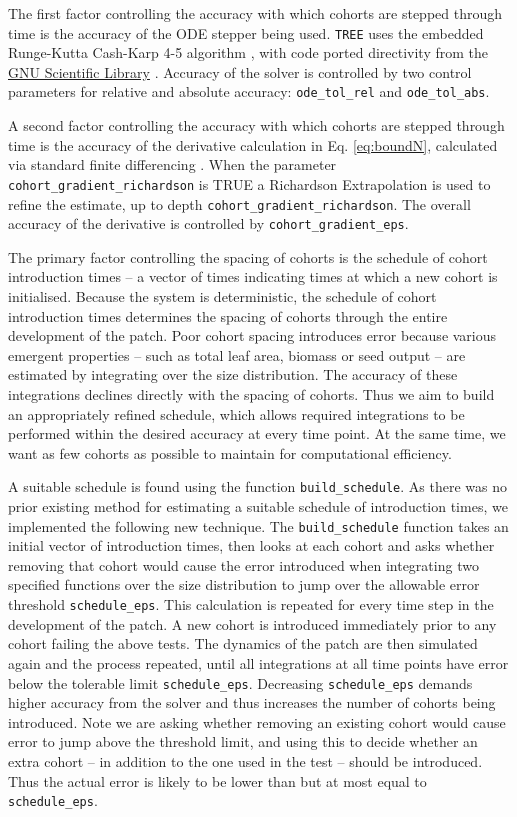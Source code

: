\documentclass[10pt,twoside]{article}
\begin{document}
The first factor controlling the accuracy with which cohorts are stepped
through time is the accuracy of the ODE stepper being used. \texttt{TREE} uses
the embedded Runge-Kutta Cash-Karp 4-5 algorithm \citep{Cash-1990}, with
code ported directivity from the
\href{http://www.gnu.org/software/gsl/}{GNU Scientific Library}
\citep{Galassi-2009}. Accuracy of the solver is controlled by two
control parameters for relative and absolute accuracy:
\texttt{ode\_tol\_rel} and \texttt{ode\_tol\_abs}.

A second factor controlling the accuracy with which cohorts are stepped
through time is the accuracy of the derivative calculation in Eq.
\ref{eq:boundN}, calculated via standard finite differencing
\citep{Abramowitz-2012}. When the parameter
\texttt{cohort\_gradient\_richardson} is TRUE a Richardson Extrapolation
\citep{Stoer-2002} is used to refine the estimate, up to depth
\texttt{cohort\_gradient\_richardson}. The overall accuracy of the
derivative is controlled by \texttt{cohort\_gradient\_eps}.

The primary factor controlling the spacing of cohorts is the schedule of
cohort introduction times -- a vector of times indicating times at which
a new cohort is initialised. Because the system is deterministic, the
schedule of cohort introduction times determines the spacing of cohorts
through the entire development of the patch. Poor cohort spacing
introduces error because various emergent properties -- such as total
leaf area, biomass or seed output -- are estimated by integrating over
the size distribution. The accuracy of these integrations declines
directly with the spacing of cohorts. Thus we aim to build an
appropriately refined schedule, which allows required integrations to be
performed within the desired accuracy at every time point. At the same
time, we want as few cohorts as possible to maintain for computational
efficiency.

A suitable schedule is found using the function
\texttt{build\_schedule}. As there was no prior existing method for
estimating a suitable schedule of introduction times, we implemented the
following new technique. The \texttt{build\_schedule} function takes an
initial vector of introduction times, then looks at each cohort and asks
whether removing that cohort would cause the error introduced when
integrating two specified functions over the size distribution to jump
over the allowable error threshold \texttt{schedule\_eps}. This
calculation is repeated for every time step in the development of the
patch. A new cohort is introduced immediately prior to any cohort
failing the above tests. The dynamics of the patch are
then simulated again and the process repeated, until all integrations at
all time points have error below the tolerable limit
\texttt{schedule\_eps}. Decreasing \texttt{schedule\_eps} demands higher
accuracy from the solver and thus increases the number of cohorts being
introduced. Note we are asking whether removing an existing cohort would
cause error to jump above the threshold limit, and using this to decide
whether an extra cohort -- in addition to the one used in the test --
should be introduced. Thus the actual error is likely to
be lower than but at most equal to \texttt{schedule\_eps}.
\end{document}
